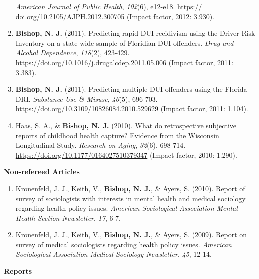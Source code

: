 \documentclass[
]{article}
\begin{document}
\begin{enumerate}
  \emph{American Journal of Public Health}, \emph{102}(6), e12-e18.
  \href{https://}{\uline{https://}}
  \href{https://doi.org/10.2105/AJPH.2012.300705}{doi.org/10.2105/AJPH.2012.300705}
  (Impact factor, 2012: 3.930).
\item
  \textbf{Bishop, N. J.} (2011). Predicting rapid DUI recidivism using
  the Driver Risk Inventory on a state-wide sample of Floridian DUI
  offenders. \emph{Drug and Alcohol Dependence}, \emph{118}(2), 423-429.
  \url{https://doi.org/10.1016/j.drugalcdep.2011.05.006} (Impact factor,
  2011: 3.383).
\item
  \textbf{Bishop, N. J.} (2011). Predicting multiple DUI offenders using
  the Florida DRI. \emph{Substance Use \& Misuse}, \emph{46}(5),
  696-703. \url{https://doi.org/10.3109/10826084.2010.529629} (Impact
  factor, 2011: 1.104).
\item
  Haas, S. A., \& \textbf{Bishop, N. J.} (2010). What do retrospective
  subjective reports of childhood health capture? Evidence from the
  Wisconsin Longitudinal Study. \emph{Research on Aging}, \emph{32}(6),
  698-714. \url{https://doi.org/10.1177/0164027510379347} (Impact
  factor, 2010: 1.290).
\end{enumerate}

\textbf{Non-refereed Articles}

\begin{enumerate}
\def\labelenumi{\arabic{enumi}.}
\item
  Kronenfeld, J. J., Keith, V., \textbf{Bishop, N. J.}, \& Ayers, S.
  (2010). Report of survey of sociologists with interests in mental
  health and medical sociology regarding health policy issues.
  \emph{American Sociological Association Mental Health Section
  Newsletter}, \emph{17}, 6-7.
\item
  Kronenfeld, J. J., Keith, V., \textbf{Bishop, N. J.}, \& Ayers, S.
  (2009). Report on survey of medical sociologists regarding health
  policy issues. \emph{American Sociological Association Medical
  Sociology Newsletter}, \emph{45}, 12-14.
\end{enumerate}

\textbf{Reports}
\end{document}
